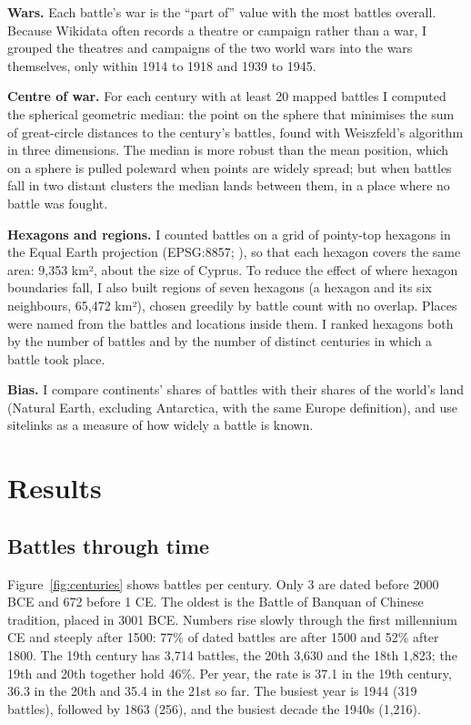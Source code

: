 \documentclass[11pt,a4paper]{article}
\begin{document}
\textbf{Wars.} Each battle's war is the ``part of'' value with the most battles overall. Because Wikidata often records a theatre or campaign rather than a war, I grouped the theatres and campaigns of the two world wars into the wars themselves, only within 1914 to 1918 and 1939 to 1945.

\textbf{Centre of war.} For each century with at least 20 mapped battles I computed the spherical geometric median: the point on the sphere that minimises the sum of great-circle distances to the century's battles, found with Weiszfeld's algorithm in three dimensions. The median is more robust than the mean position, which on a sphere is pulled poleward when points are widely spread; but when battles fall in two distant clusters the median lands between them, in a place where no battle was fought.

\textbf{Hexagons and regions.} I counted battles on a grid of pointy-top hexagons in the Equal Earth projection (EPSG:8857; \citealp{equalearth}), so that each hexagon covers the same area: 9,353 km², about the size of Cyprus. To reduce the effect of where hexagon boundaries fall, I also built regions of seven hexagons (a hexagon and its six neighbours, 65,472 km²), chosen greedily by battle count with no overlap. Places were named from the battles and locations inside them. I ranked hexagons both by the number of battles and by the number of distinct centuries in which a battle took place.

\textbf{Bias.} I compare continents' shares of battles with their shares of the world's land (Natural Earth, excluding Antarctica, with the same Europe definition), and use sitelinks as a measure of how widely a battle is known.

\section{Results}
\subsection{Battles through time}
Figure~\ref{fig:centuries} shows battles per century. Only 3 are dated before 2000 BCE and 672 before 1 CE. The oldest is the Battle of Banquan of Chinese tradition, placed in 3001 BCE. Numbers rise slowly through the first millennium CE and steeply after 1500: 77\% of dated battles are after 1500 and 52\% after 1800. The 19th century has 3,714 battles, the 20th 3,630 and the 18th 1,823; the 19th and 20th together hold 46\%. Per year, the rate is 37.1 in the 19th century, 36.3 in the 20th and 35.4 in the 21st so far. The busiest year is 1944 (319 battles), followed by 1863 (256), and the busiest decade the 1940s (1,216).
\end{document}
